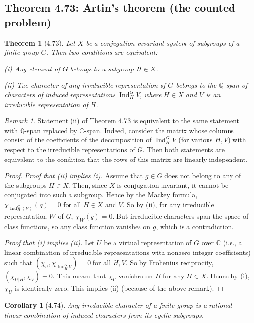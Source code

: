\documentclass[UTF8,11pt,a4paper]{ctexart}
\newtheorem*{theorem}{Theorem}
\newtheorem*{corollary}{Corollary}
\theoremstyle{definition}\newtheorem*{definition}{Definition}
\theoremstyle{remark}\newtheorem*{remark}{Remark}
\DeclareMathOperator{\Ind}{Ind}
\newcommand{\C}{\mathbb C}
\newcommand{\Q}{\mathbb Q}
\begin{document}
\subsection*{Theorem 4.73: Artin's theorem (the counted problem)}
\begin{theorem}[4.73]
Let $X$ be a conjugation-invariant system of subgroups of a finite group $G$. Then two conditions are equivalent:

(i) Any element of $G$ belongs to a subgroup $H\in X$.

(ii) The character of any irreducible representation of $G$ belongs to the $\Q$-span of characters of induced representations $\Ind_H^G V$, where $H\in X$ and $V$ is an irreducible representation of $H$.
\end{theorem}
\begin{remark}
Statement (ii) of Theorem 4.73 is equivalent to the same statement with $\Q$-span replaced by $\C$-span. Indeed, consider the matrix whose columns consist of the coefficients of the decomposition of $\Ind_H^G V$ (for various $H,V$) with respect to the irreducible representations of $G$. Then both statements are equivalent to the condition that the rows of this matrix are linearly independent.
\end{remark}
\begin{proof}
\emph{Proof that (ii) implies (i).} Assume that $g\in G$ does not belong to any of the subgroups $H\in X$. Then, since $X$ is conjugation invariant, it cannot be conjugated into such a subgroup. Hence by the Mackey formula, $\chi_{\Ind_H^G(V)}(g)=0$ for all $H\in X$ and $V$. So by (ii), for any irreducible representation $W$ of $G$, $\chi_W(g)=0$. But irreducible characters span the space of class functions, so any class function vanishes on $g$, which is a contradiction.

\emph{Proof that (i) implies (ii).} Let $U$ be a virtual representation of $G$ over $\C$ (i.e., a linear combination of irreducible representations with nonzero integer coefficients) such that $(\chi_U,\chi_{\Ind_H^G V})=0$ for all $H,V$. So by Frobenius reciprocity, $(\chi_{U|H},\chi_V)=0$. This means that $\chi_U$ vanishes on $H$ for any $H\in X$. Hence by (i), $\chi_U$ is identically zero. This implies (ii) (because of the above remark).
\end{proof}
\begin{corollary}[4.74]
Any irreducible character of a finite group is a rational linear combination of induced characters from its cyclic subgroups.
\end{corollary}
\end{document}
